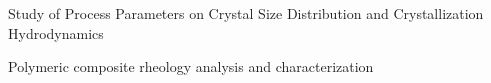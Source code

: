 \begin{cventries}
{\begin{cvitemsfree}
                \item{Study of Process Parameters on Crystal Size Distribution and Crystallization Hydrodynamics}
                \item{Polymeric composite rheology analysis and characterization}
            \end{cvitemsfree}
        }
\end{cventries}